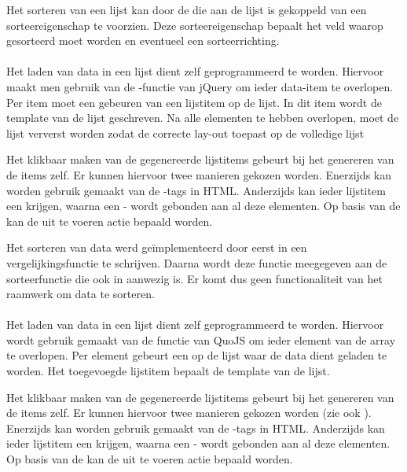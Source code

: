 Het sorteren van een lijst kan door de  die aan de lijst is gekoppeld van een sorteereigenschap te voorzien.
Deze sorteereigenschap bepaalt het veld waarop gesorteerd moet worden en eventueel een sorteerrichting.

\paragraph{\jqm}
Het laden van data in een lijst dient zelf geprogrammeerd te worden.
Hiervoor maakt men gebruik van de -functie van jQuery om ieder data-item te overlopen.
Per item moet een  gebeuren van een lijstitem op de lijst.
In dit item wordt de template van de lijst geschreven.
Na alle elementen te hebben overlopen, moet de lijst ververst worden zodat \jqm{} de correcte lay-out toepast op de volledige lijst

Het klikbaar maken van de gegenereerde lijstitems gebeurt bij het genereren van de items zelf.
Er kunnen hiervoor twee manieren gekozen worden.
Enerzijds kan worden gebruik gemaakt van de -tags in HTML.
Anderzijds kan ieder lijstitem een  krijgen, waarna een -  wordt gebonden aan al deze elementen.
Op basis van de  kan de uit te voeren actie bepaald worden.

Het sorteren van data werd geïmplementeerd door eerst in \js{} een vergelijkingsfunctie te schrijven.
Daarna wordt deze functie meegegeven aan de sorteerfunctie die ook in \js{} aanwezig is.
Er komt dus geen functionaliteit van het raamwerk om data te sorteren.

\paragraph{\lungo}
Het laden van data in een lijst dient zelf geprogrammeerd te worden.
Hiervoor wordt gebruik gemaakt van de functie  van QuoJS om ieder element van de array te overlopen.
Per element gebeurt een  op de lijst waar de data dient geladen te worden.
Het toegevoegde lijstitem bepaalt de template van de lijst.

Het klikbaar maken van de gegenereerde lijstitems gebeurt bij het genereren van de items zelf.
Er kunnen hiervoor twee manieren gekozen worden (zie ook \jqm{}).
Enerzijds kan worden gebruik gemaakt van de -tags in HTML.
Anderzijds kan ieder lijstitem een  krijgen, waarna een -  wordt gebonden aan al deze elementen.
Op basis van de  kan de uit te voeren actie bepaald worden.

